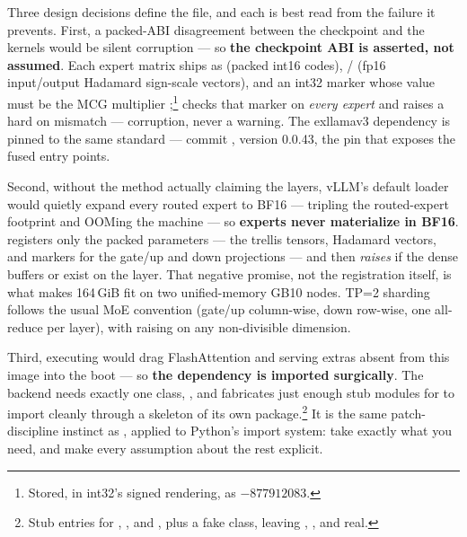 Three design decisions define the file, and each is best read from the
failure it prevents. First, a packed-ABI disagreement between the checkpoint
and the kernels would be silent corruption --- so \textbf{the checkpoint ABI
is asserted, not assumed}. Each expert matrix ships as 
(packed int16 codes), / (fp16 input/output Hadamard
sign-scale vectors), and an int32  marker whose value must be the
MCG multiplier ;\footnote{Stored, in int32's signed
rendering, as $-877912083$.}  checks
that marker on \emph{every expert} and raises a hard  on
mismatch --- corruption, never a warning. The exllamav3 dependency is pinned
to the same standard --- commit , version 0.0.43, the pin that
exposes the fused  entry points.

Second, without the method actually claiming the layers, vLLM's default
loader would quietly expand every routed expert to BF16 --- tripling the
routed-expert footprint and OOMing the machine --- so \textbf{experts never
materialize in BF16}.  registers only the packed
parameters --- the trellis tensors, Hadamard vectors, and markers for the
gate/up and down projections --- and then \emph{raises} if the dense buffers
 or  exist on the layer. That negative
promise, not the  registration itself, is what makes 164\,GiB
fit on two unified-memory GB10 nodes. TP=2 sharding follows the usual MoE
convention (gate/up column-wise, down row-wise, one all-reduce per layer),
with  raising on any non-divisible dimension.

Third, executing  would drag FlashAttention and
serving extras absent from this image into the boot --- so \textbf{the
dependency is imported surgically}. The backend needs exactly one class,
, and  fabricates just
enough stub modules for
 to import cleanly through a
skeleton of its own package.\footnote{Stub  entries
for , , and ,
plus a fake  class, leaving , , and
 real.} It is the same patch-discipline instinct as
, applied to Python's import system: take exactly what you
need, and make every assumption about the rest explicit.

